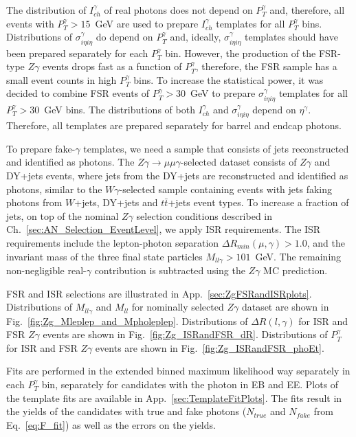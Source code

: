 The distribution of $I_{ch}^{\gamma}$ of real photons does not depend on $P_{T}^{\gamma}$ and, therefore, all events with $P_{T}^{\gamma}>15$~GeV are used to prepare $I_{ch}^{\gamma}$ templates for all $P_T^{\gamma}$ bins. Distributions of $\sigma_{i\eta i\eta}^{\gamma}$ do depend on $P_T^{\gamma}$ and, ideally,  $\sigma_{i\eta i\eta}^{\gamma}$ templates should have been prepared separately for each $P_T^{\gamma}$ bin. However, the production of the FSR-type $Z\gamma$ events drops fast as a function of $P_{T}^{\gamma}$, therefore, the FSR sample has a small event counts in high $P_T^{\gamma}$ bins. To increase the statistical power, it was decided to combine FSR events of $P_T^{\gamma}>30$~GeV to prepare $\sigma_{i\eta i\eta}^{\gamma}$ templates for all $P_T^{\gamma}>30$~GeV bins. 
The distributions of both $I_{ch}^{\gamma}$ and $\sigma_{i\eta i\eta}^{\gamma}$ depend on $\eta^{\gamma}$. Therefore, all templates are prepared separately for barrel and endcap photons.

To prepare fake-$\gamma$ templates, we need a sample that consists of jets reconstructed and identified as photons. The $Z\gamma\rightarrow\mu\mu\gamma$-selected dataset consists of $Z\gamma$ and DY+jets events, where jets from the DY+jets are reconstructed and identified as photons, similar to the $W\gamma$-selected sample containing events with jets faking photons from $W$+jets, DY+jets and $t\bar{t}$+jets event types. To increase a fraction of jets, on top of the nominal $Z\gamma$ selection conditions described in Ch.~\ref{sec:AN_Selection_EventLevel}, we apply ISR requirements. The ISR requirements include the lepton-photon separation $\Delta{R_{min}}(\mu,\gamma)>1.0$, and the invariant mass of the three final state particles $M_{ll\gamma}>101$~GeV. The remaining non-negligible real-$\gamma$ contribution is subtracted using the $Z\gamma$ MC prediction.

FSR and ISR selections are illustrated in App.~\ref{sec:ZgFSRandISRplots}. Distributions of $M_{ll\gamma}$ and $M_{ll}$ for nominally selected $Z\gamma$ dataset are shown in Fig.~\ref{fig:Zg_Mleplep_and_Mpholeplep}. Distributions of $\Delta{R}(l,\gamma)$ for ISR and FSR $Z\gamma$ events are shown in Fig.~\ref{fig:Zg_ISRandFSR_dR}. Distributions of $P_{T}^{\gamma}$ for ISR and FSR $Z\gamma$ events are shown in Fig.~\ref{fig:Zg_ISRandFSR_phoEt}. 

Fits are performed in the extended binned maximum likelihood way separately in each $P_T^{\gamma}$ bin, separately for candidates with the photon in EB and EE. Plots of the template fits are available in App.~\ref{sec:TemplateFitPlots}. The fits result in the yields of the candidates with true and fake photons ($N_{true}$ and $N_{fake}$ from Eq.~\ref{eq:F_fit}) as well as the errors on the yields.

